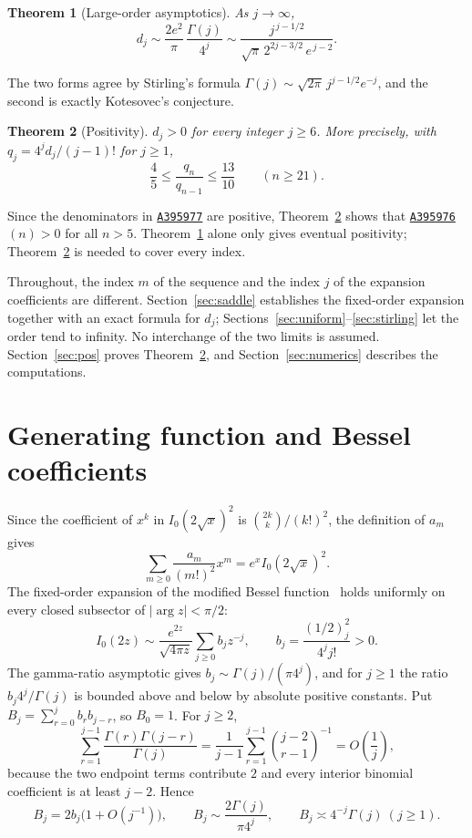 \documentclass[11pt,a4paper]{article}
\newtheorem{theorem}{Theorem}
\theoremstyle{remark}
\newcommand{\oeis}[1]{\href{https://oeis.org/#1}{\texttt{#1}}}
\begin{document}
\begin{theorem}[Large-order asymptotics]\label{thm:asym}
As $j\to\infty$,
\[
  d_j\sim\frac{2e^2}{\pi}\,\frac{\Gamma(j)}{4^j}\sim\frac{j^{\,j-1/2}}{\sqrt\pi\,2^{2j-3/2}\,e^{\,j-2}} .
\]
\end{theorem}

The two forms agree by Stirling's formula $\Gamma(j)\sim\sqrt{2\pi}\,j^{j-1/2}e^{-j}$, and the second is exactly Kotesovec's conjecture.

\begin{theorem}[Positivity]\label{thm:pos}
$d_j>0$ for every integer $j\ge6$. More precisely, with $q_j=4^jd_j/(j-1)!$ for $j\ge1$,
\[
  \frac45\le\frac{q_n}{q_{n-1}}\le\frac{13}{10}\qquad(n\ge21).
\]
\end{theorem}

Since the denominators in \oeis{A395977} are positive, Theorem~\ref{thm:pos} shows that \oeis{A395976}$(n)>0$ for all $n>5$. Theorem~\ref{thm:asym} alone only gives eventual positivity; Theorem~\ref{thm:pos} is needed to cover every index.

Throughout, the index $m$ of the sequence and the index $j$ of the expansion coefficients are different. Section~\ref{sec:saddle} establishes the fixed-order expansion together with an exact formula for $d_j$; Sections~\ref{sec:uniform}--\ref{sec:stirling} let the order tend to infinity. No interchange of the two limits is assumed. Section~\ref{sec:pos} proves Theorem~\ref{thm:pos}, and Section~\ref{sec:numerics} describes the computations.

\section{Generating function and Bessel coefficients}\label{sec:bessel}

Since the coefficient of $x^k$ in $I_0(2\sqrt x)^2$ is $\binom{2k}k/(k!)^2$, the definition of $a_m$ gives
\[
  \sum_{m\ge0}\frac{a_m}{(m!)^2}x^m=e^xI_0(2\sqrt x)^2 .
\]
The fixed-order expansion of the modified Bessel function~\cite[10.40.1, 10.17.1]{DLMF} holds uniformly on every closed subsector of $|\arg z|<\pi/2$:
\[
  I_0(2z)\sim\frac{e^{2z}}{\sqrt{4\pi z}}\sum_{j\ge0}b_jz^{-j},\qquad b_j=\frac{(1/2)_j^2}{4^jj!}>0 .
\]
The gamma-ratio asymptotic gives $b_j\sim\Gamma(j)/(\pi4^j)$, and for $j\ge1$ the ratio $b_j4^j/\Gamma(j)$ is bounded above and below by absolute positive constants. Put $B_j=\sum_{r=0}^jb_rb_{j-r}$, so $B_0=1$. For $j\ge2$,
\[
  \sum_{r=1}^{j-1}\frac{\Gamma(r)\Gamma(j-r)}{\Gamma(j)}=\frac1{j-1}\sum_{r=1}^{j-1}\binom{j-2}{r-1}^{-1}=O\!\left(\frac1j\right),
\]
because the two endpoint terms contribute $2$ and every interior binomial coefficient is at least $j-2$. Hence
\begin{equation}\label{eq:B}
  B_j=2b_j\bigl(1+O(j^{-1})\bigr),\qquad B_j\sim\frac{2\Gamma(j)}{\pi4^j},\qquad B_j\asymp4^{-j}\Gamma(j)\ (j\ge1).
\end{equation}
\end{document}
